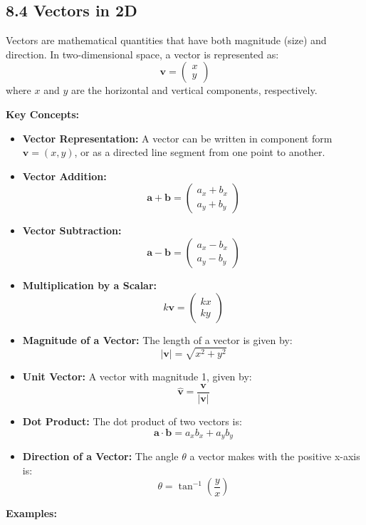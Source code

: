 
\subsection*{8.4 Vectors in 2D}

Vectors are mathematical quantities that have both magnitude (size) and direction. In two-dimensional space, a vector is represented as:
\[
\mathbf{v} = \begin{pmatrix} x \\ y \end{pmatrix}
\]
where \(x\) and \(y\) are the horizontal and vertical components, respectively.

\textbf{Key Concepts:}
\begin{itemize}
	\item \textbf{Vector Representation:} A vector can be written in component form \( \mathbf{v} = (x, y) \), or as a directed line segment from one point to another.
	\item \textbf{Vector Addition:} 
	\[
	\mathbf{a} + \mathbf{b} = \begin{pmatrix} a_x + b_x \\ a_y + b_y \end{pmatrix}
	\]
	\item \textbf{Vector Subtraction:} 
	\[
	\mathbf{a} - \mathbf{b} = \begin{pmatrix} a_x - b_x \\ a_y - b_y \end{pmatrix}
	\]
	\item \textbf{Multiplication by a Scalar:} 
	\[
	k\mathbf{v} = \begin{pmatrix} kx \\ ky \end{pmatrix}
	\]
	\item \textbf{Magnitude of a Vector:} The length of a vector is given by:
	\[
	|\mathbf{v}| = \sqrt{x^2 + y^2}
	\]
	\item \textbf{Unit Vector:} A vector with magnitude 1, given by:
	\[
	\hat{\mathbf{v}} = \frac{\mathbf{v}}{|\mathbf{v}|}
	\]
	\item \textbf{Dot Product:} The dot product of two vectors is:
	\[
	\mathbf{a} \cdot \mathbf{b} = a_x b_x + a_y b_y
	\]
	\item \textbf{Direction of a Vector:} The angle \( \theta \) a vector makes with the positive x-axis is:
	\[
	\theta = \tan^{-1} \left(\frac{y}{x}\right)
	\]
\end{itemize}

\textbf{Examples:}


